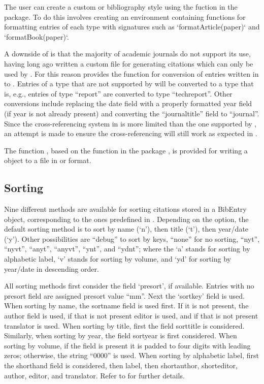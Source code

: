 \documentclass[article]{jss}\usepackage[]{graphicx}\usepackage[]{color}
\newcommand{\ourpkg}{\pkg{RefManageR}}
\begin{document}
The user can create a custom \Biblatex{} or \Bibtex{} bibliography style using the  fuction in the  package.  To do this involves creating an environment containing functions for formatting entries of each type with signatures such as `formatArticle(paper)` and `formatBook(paper)`.

A downside of \Biblatex{} is that the majority of academic journals do not support its use, having long ago written a custom  file for generating citations which can only be used by \Bibtex{}.  For this reason \ourpkg{} provides the function  for conversion of entries written in \Biblatex{} to \Bibtex{}.  Entries of a type that are not supported by \Bibtex{} will be converted to a type that is, e.g., entries of type ``report'' are converted to type ``techreport''.  Other conversions include replacing the date field with a properly formatted year field (if year is not already present) and converting the ``journaltitle'' field to ``journal''.  Since the cross-referencing system in \Bibtex{} is more limited than the one supported by \Biblatex{}, an attempt is made to ensure the cross-referencing will still work as expected in \Bibtex{}.

The function , based on the function  in the package  \citep{Rbibtex}, is provided for writing a  object to a  file in \Biblatex{} or \Bibtex{} format.
\subsection{Sorting}
Nine different methods are available for sorting citations stored in a BibEntry object, corresponding to the ones predefined in \Biblatex{}.  Depending on the  option, the default sorting method is  to sort by name (`n'), then title (`t'), then year/date (`y').  Other possibilities are ``debug'' to sort by keys, ``none'' for no sorting, ``nyt'', ``nyvt'', ``anyt'', ``anyvt'', ``ynt'', and ``ydnt''; where the `a' stands for sorting by alphabetic label, `v' stands for sorting by volume, and `yd' for sorting by year/date in descending order.

All sorting methods first consider the field `presort', if available. Entries with no presort field are assigned presort value ``mm''. Next the `sortkey' field is used.  When sorting by name, the sortname field is used first. If it is not present, the author field is used, if that is not present editor is used, and if that is not present translator is used.  When sorting by title, first the field sorttitle is considered. Similarly, when sorting by year, the field sortyear is first considered.  When sorting by volume, if the field is present it is padded to four digits with leading zeros; otherwise, the string ``0000'' is used.  When sorting by alphabetic label, first the shorthand field is considered, then label, then shortauthor, shorteditor, author, editor, and translator. Refer to \citet[Sections~3.1.2.1 and 3.5 and Appendix~C.2][]{biblatex} for further details.
\end{document}
